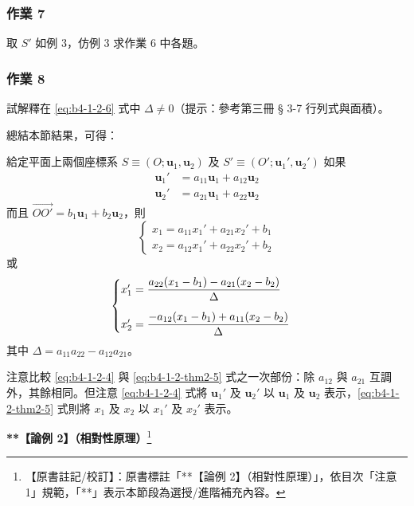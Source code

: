 \subsubsection*{作業 7}
取 $S'$ 如例 3，仿例 3 求作業 6 中各題。

\subsubsection*{作業 8}
試解釋在 \eqref{eq:b4-1-2-6} 式中 $\Delta \neq 0$（提示：參考第三冊 § 3-7 行列式與面積）。

總結本節結果，可得：

\begin{theorem}[定理 2]
給定平面上兩個座標系 $S \equiv (O; \mathbf{u}_1, \mathbf{u}_2)$ 及 $S' \equiv (O'; \mathbf{u}_1', \mathbf{u}_2')$ 如果
\begin{align*}
\mathbf{u}_1' &= a_{11}\mathbf{u}_1 + a_{12}\mathbf{u}_2 \\
\mathbf{u}_2' &= a_{21}\mathbf{u}_1 + a_{22}\mathbf{u}_2
\end{align*}
而且 $\vec{OO'} = b_1\mathbf{u}_1 + b_2\mathbf{u}_2$，則
\begin{equation}
\begin{cases}
x_1 = a_{11}x_1' + a_{21}x_2' + b_1 \\
x_2 = a_{12}x_1' + a_{22}x_2' + b_2
\end{cases} \label{eq:b4-1-2-thm2-5}
\end{equation}
或
\begin{equation}
\begin{cases}
x_1' = \dfrac{a_{22}(x_1 - b_1) - a_{21}(x_2 - b_2)}{\Delta} \\ \noalign{\vskip 1em}
x_2' = \dfrac{-a_{12}(x_1 - b_1) + a_{11}(x_2 - b_2)}{\Delta}
\end{cases} \label{eq:b4-1-2-thm2-6}
\end{equation}
其中 $\Delta = a_{11}a_{22} - a_{12}a_{21}$。
\end{theorem}

注意比較 \eqref{eq:b4-1-2-4} 與 \eqref{eq:b4-1-2-thm2-5} 式之一次部份：除 $a_{12}$ 與 $a_{21}$ 互調外，其餘相同。但注意 \eqref{eq:b4-1-2-4} 式將 $\mathbf{u}_1'$ 及 $\mathbf{u}_2'$ 以 $\mathbf{u}_1$ 及 $\mathbf{u}_2$ 表示，\eqref{eq:b4-1-2-thm2-5} 式則將 $x_1$ 及 $x_2$ 以 $x_1'$ 及 $x_2'$ 表示。

\vspace{1em}
\noindent\textbf{**【論例 2】（相對性原理）}\label{note:b4-ch1-p16-lorentz}\footnote{【原書註記/校訂】：原書標註「**【論例 2】（相對性原理）」，依目次「注意 1」規範，「**」表示本節段為選授/進階補充內容。}

